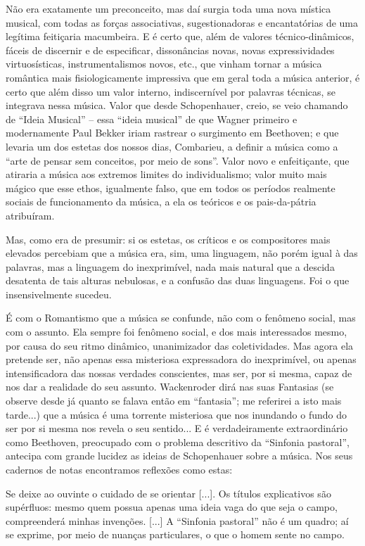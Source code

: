 Não era exatamente um preconceito, mas daí surgia toda uma nova mística
musical, com todas as forças associativas, sugestionadoras e
encantatórias de uma legítima feitiçaria macumbeira. E é certo que, além
de valores técnico-dinâmicos, fáceis de discernir e de especificar,
dissonâncias novas, novas expressividades virtuosísticas,
instrumentalismos novos, etc., que vinham tornar a música romântica mais
fisiologicamente impressiva que em geral toda a música anterior, é certo
que além disso um valor interno, indiscernível por palavras técnicas, se
integrava nessa música. Valor que desde Schopenhauer, creio, se veio
chamando de ``Ideia Musical'' -- essa ``ideia musical'' de que Wagner
primeiro e modernamente Paul Bekker iriam rastrear o surgimento em
Beethoven; e que levaria um dos estetas dos nossos dias, Combarieu, a
definir a música como a ``arte de pensar sem conceitos, por meio de
sons''. Valor novo e enfeitiçante, que atiraria a música aos extremos
limites do individualismo; valor muito mais mágico que esse ethos,
igualmente falso, que em todos os períodos realmente sociais de
funcionamento da música, a ela os teóricos e os pais-da-pátria
atribuíram.

Mas, como era de presumir: si os estetas, os críticos e os compositores
mais elevados percebiam que a música era, sim, uma linguagem, não porém
igual à das palavras, mas a linguagem do inexprimível, nada mais natural
que a descida desatenta de tais alturas nebulosas, e a confusão das duas
linguagens. Foi o que insensivelmente sucedeu.

É com o Romantismo que a música se confunde, não com o fenômeno social,
mas com o assunto. Ela sempre foi fenômeno social, e dos mais
interessados mesmo, por causa do seu ritmo dinâmico, unanimizador das
coletividades. Mas agora ela pretende ser, não apenas essa misteriosa
expressadora do inexprimível, ou apenas intensificadora das nossas
verdades conscientes, mas ser, por si mesma, capaz de nos dar a
realidade do seu assunto. Wackenroder dirá nas suas Fantasias (se
observe desde já quanto se falava então em ``fantasia''; me referirei a
isto mais tarde...) que a música é uma torrente misteriosa que nos
inundando o fundo do ser por si mesma nos revela o seu sentido... E é
verdadeiramente extraordinário como Beethoven, preocupado com o problema
descritivo da ``Sinfonia pastoral'', antecipa com grande lucidez as
ideias de Schopenhauer sobre a música. Nos seus cadernos de notas
encontramos reflexões como estas:

Se deixe ao ouvinte o cuidado de se orientar {[}...{]}. Os títulos
explicativos são supérfluos: mesmo quem possua apenas uma ideia vaga do
que seja o campo, compreenderá minhas invenções. {[}...{]} A ``Sinfonia
pastoral'' não é um quadro; aí se exprime, por meio de nuanças
particulares, o que o homem sente no campo.

